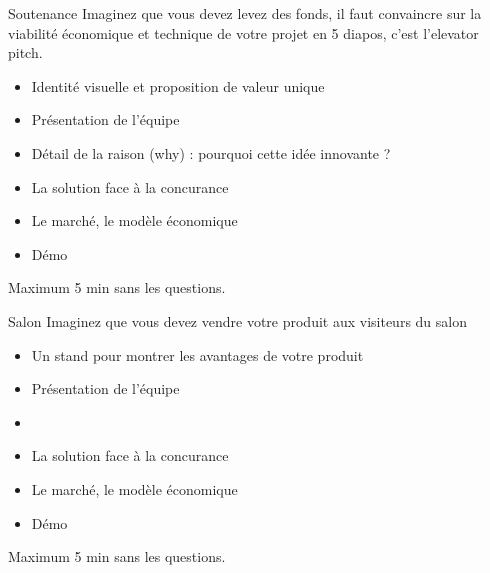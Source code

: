 \documentclass{beamer}
\begin{document}
\begin{frame}{Soutenance}
  Imaginez que vous devez levez des fonds, il faut convaincre sur la viabilité économique et technique de votre projet en 5 diapos, c'est l'elevator pitch.
  \begin{itemize}
    \item Identité visuelle et proposition de valeur unique
    \item Présentation de l'équipe
    \item Détail de la raison (why) : pourquoi cette idée innovante ?
    \item La solution face à la concurance 
    \item Le marché, le modèle économique
    \item Démo
  \end{itemize}

  Maximum 5 min sans les questions.
\end{frame}

\begin{frame}{Salon}
  Imaginez que vous devez vendre votre produit aux visiteurs du salon
  \begin{itemize}
    \item Un stand pour montrer les avantages de votre produit
    \item Présentation de l'équipe
    \item 
    \item La solution face à la concurance 
    \item Le marché, le modèle économique
    \item Démo
  \end{itemize}

  Maximum 5 min sans les questions.
\end{frame}
\end{document}
